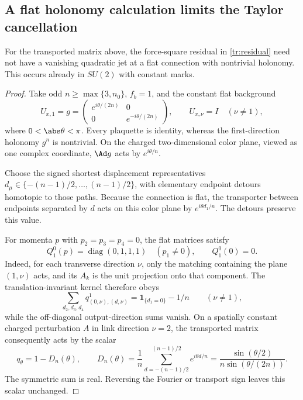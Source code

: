 \subsection{A flat holonomy calculation limits the Taylor cancellation}

\begin{proposition}
\label{tr:toron}
For the transported matrix above, the force-square residual in
\eqref{tr:residual} need not have a vanishing quadratic jet at a flat
connection with nontrivial holonomy. This occurs already in \(SU(2)\) with
constant marks.
\end{proposition}

\begin{proof}
Take odd \(n\ge\max\{3,n_0\}\), \(f_b=1\), and the constant flat background
\[
 U_{x,1}=g=\begin{pmatrix}e^{i\theta/(2n)}&0\\0&e^{-i\theta/(2n)}\end{pmatrix},
 \qquad U_{x,\nu}=I\quad(\nu\ne1),
\]
where \(0<\abs\theta<\pi\). Every plaquette is identity, whereas the
first-direction holonomy \(g^n\) is nontrivial. On the charged two-dimensional
color plane, viewed as one complex coordinate, \(\Ad g\) acts by
\(e^{i\theta/n}\).

Choose the signed shortest displacement representatives
\(d_\mu\in\{-(n-1)/2,\ldots,(n-1)/2\}\), with elementary endpoint
detours homotopic to those paths. Because the connection is flat, the
transporter between endpoints separated by \(d\) acts on this color plane
by \(e^{i\theta d_1/n}\). The detours preserve this value.

For momenta \(p\) with \(p_2=p_3=p_4=0\), the flat matrices satisfy
\[
 Q_1^0(p)=\operatorname{diag}(0,1,1,1)\quad(p_1\ne0),
 \qquad Q_1^0(0)=0.
\]
Indeed, for each transverse direction \(\nu\), only the matching containing
the plane \((1,\nu)\) acts, and its \(A_k\) is the unit projection onto that
component. The translation-invariant kernel therefore obeys
\[
 \sum_{d_2,d_3,d_4}q^1_{(0,\nu),(d,\nu)}
     =\mathbf 1_{\{d_1=0\}}-1/n\qquad(\nu\ne1),
\]
while the off-diagonal output-direction sums vanish. On a spatially constant
charged perturbation \(A\) in link direction \(\nu=2\), the transported
matrix consequently acts by the scalar
\begin{equation}
 q_\theta=1-D_n(\theta),\qquad
 D_n(\theta)=\frac1n\sum_{d=-(n-1)/2}^{(n-1)/2}e^{i\theta d/n}
       =\frac{\sin(\theta/2)}{n\sin(\theta/(2n))}.
 \label{tr:toronmultiplier}
\end{equation}
The symmetric sum is real. Reversing the Fourier or transport sign leaves
this scalar unchanged.


\end{proof}
